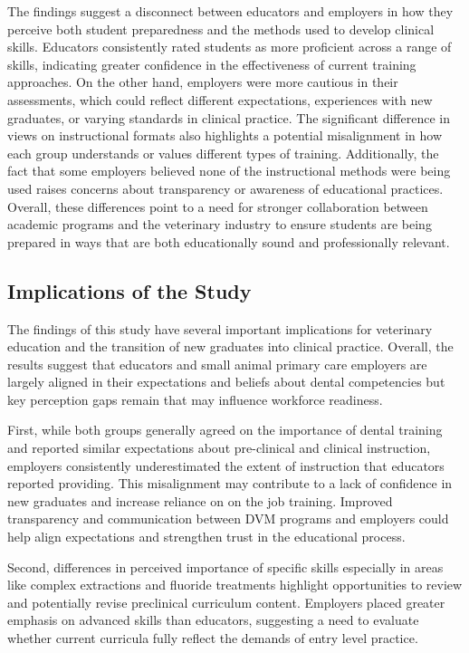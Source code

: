 \documentclass[
  12pt,
  letterpaper,
  DIV=11,
  numbers=noendperiod]{scrartcl}
\numberwithin{figure}{section}
\numberwithin{table}{section}
\begin{document}
The findings suggest a disconnect between educators and employers in how
they perceive both student preparedness and the methods used to develop
clinical skills. Educators consistently rated students as more
proficient across a range of skills, indicating greater confidence in
the effectiveness of current training approaches. On the other hand,
employers were more cautious in their assessments, which could reflect
different expectations, experiences with new graduates, or varying
standards in clinical practice. The significant difference in views on
instructional formats also highlights a potential misalignment in how
each group understands or values different types of training.
Additionally, the fact that some employers believed none of the
instructional methods were being used raises concerns about transparency
or awareness of educational practices. Overall, these differences point
to a need for stronger collaboration between academic programs and the
veterinary industry to ensure students are being prepared in ways that
are both educationally sound and professionally relevant.

\subsection{Implications of the Study}\label{implications-of-the-study}

The findings of this study have several important implications for
veterinary education and the transition of new graduates into clinical
practice. Overall, the results suggest that educators and small animal
primary care employers are largely aligned in their expectations and
beliefs about dental competencies but key perception gaps remain that
may influence workforce readiness.

First, while both groups generally agreed on the importance of dental
training and reported similar expectations about pre-clinical and
clinical instruction, employers consistently underestimated the extent
of instruction that educators reported providing. This misalignment may
contribute to a lack of confidence in new graduates and increase
reliance on on the job training. Improved transparency and communication
between DVM programs and employers could help align expectations and
strengthen trust in the educational process.

Second, differences in perceived importance of specific skills
especially in areas like complex extractions and fluoride treatments
highlight opportunities to review and potentially revise preclinical
curriculum content. Employers placed greater emphasis on advanced skills
than educators, suggesting a need to evaluate whether current curricula
fully reflect the demands of entry level practice.
\end{document}
